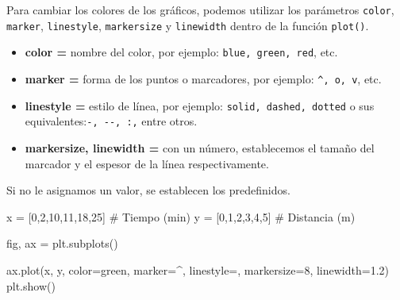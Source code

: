 \documentclass[
  letterpaper,
  DIV=11,
  numbers=noendperiod]{scrreprt}
\newenvironment{Shaded}{\begin{snugshade}}{\end{snugshade}}
\newcommand{\CommentTok}[1]{\textcolor[rgb]{0.37,0.37,0.37}{#1}}
\newcommand{\DecValTok}[1]{\textcolor[rgb]{0.68,0.00,0.00}{#1}}
\newcommand{\FloatTok}[1]{\textcolor[rgb]{0.68,0.00,0.00}{#1}}
\newcommand{\NormalTok}[1]{\textcolor[rgb]{0.00,0.23,0.31}{#1}}
\newcommand{\OperatorTok}[1]{\textcolor[rgb]{0.37,0.37,0.37}{#1}}
\newcommand{\StringTok}[1]{\textcolor[rgb]{0.13,0.47,0.30}{#1}}
\providecommand{\tightlist}{%
  \setlength{\itemsep}{0pt}\setlength{\parskip}{0pt}}\usepackage{longtable,booktabs,array}
\begin{document}
Para cambiar los colores de los gráficos, podemos utilizar los
parámetros \texttt{color}, \texttt{marker}, \texttt{linestyle},
\texttt{markersize} y \texttt{linewidth} dentro de la función
\texttt{plot()}.

\begin{itemize}
\tightlist
\item
  \textbf{color =} nombre del color, por ejemplo:
  \texttt{\textquotesingle{}blue\textquotesingle{},\ \textquotesingle{}green\textquotesingle{},\ \textquotesingle{}red\textquotesingle{}},
  etc.
\item
  \textbf{marker =} forma de los puntos o marcadores, por ejemplo:
  \texttt{\textquotesingle{}\^{}\textquotesingle{},\ \textquotesingle{}o\textquotesingle{},\ \textquotesingle{}v\textquotesingle{}},
  etc.
\item
  \textbf{linestyle =} estilo de línea, por ejemplo:
  \texttt{\textquotesingle{}solid\textquotesingle{},\ \textquotesingle{}dashed\textquotesingle{},\ \textquotesingle{}dotted\textquotesingle{}}
  o sus
  equivalentes:\texttt{\textquotesingle{}-\textquotesingle{},\ \textquotesingle{}-\/-\textquotesingle{},\ \textquotesingle{}:\textquotesingle{},}
  entre otros.
\item
  \textbf{markersize, linewidth =} con un número, establecemos el tamaño
  del marcador y el espesor de la línea respectivamente.
\end{itemize}

Si no le asignamos un valor, se establecen los predefinidos.

\begin{Shaded}
\begin{Highlighting}[]
\NormalTok{x }\OperatorTok{=}\NormalTok{ [}\DecValTok{0}\NormalTok{,}\DecValTok{2}\NormalTok{,}\DecValTok{10}\NormalTok{,}\DecValTok{11}\NormalTok{,}\DecValTok{18}\NormalTok{,}\DecValTok{25}\NormalTok{]   }\CommentTok{\# Tiempo (min)}
\NormalTok{y }\OperatorTok{=}\NormalTok{ [}\DecValTok{0}\NormalTok{,}\DecValTok{1}\NormalTok{,}\DecValTok{2}\NormalTok{,}\DecValTok{3}\NormalTok{,}\DecValTok{4}\NormalTok{,}\DecValTok{5}\NormalTok{]       }\CommentTok{\# Distancia (m)}

\NormalTok{fig, ax }\OperatorTok{=}\NormalTok{ plt.subplots()}

\NormalTok{ax.plot(x, y, color}\OperatorTok{=}\StringTok{\textquotesingle{}green\textquotesingle{}}\NormalTok{, marker}\OperatorTok{=}\StringTok{\textquotesingle{}\^{}\textquotesingle{}}\NormalTok{, linestyle}\OperatorTok{=}\StringTok{\textquotesingle{}{-}{-}\textquotesingle{}}\NormalTok{, markersize}\OperatorTok{=}\DecValTok{8}\NormalTok{, linewidth}\OperatorTok{=}\FloatTok{1.2}\NormalTok{)}
\NormalTok{plt.show()}
\end{Highlighting}
\end{Shaded}
\end{document}
